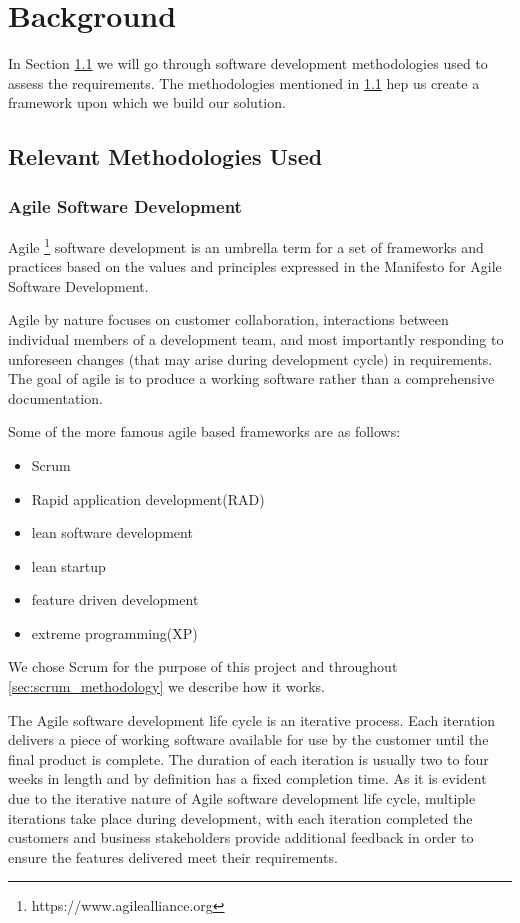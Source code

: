 \chapter{Background}
\label{chapter2}
\thispagestyle{plain}

 In Section \ref{sec:relevant_methodologies_used} we will go through software development methodologies used to assess the requirements. The methodologies mentioned in \ref{sec:relevant_methodologies_used} hep us create a framework upon which we build our solution.

\section{Relevant Methodologies Used}\label{sec:relevant_methodologies_used}


\subsection{Agile Software Development}
Agile \footnote{https://www.agilealliance.org} software development is an umbrella term for a set of frameworks and practices based on the values and principles expressed in the Manifesto for Agile Software Development.

Agile by nature focuses on customer collaboration, interactions between individual members of a development team, and most importantly responding to unforeseen changes (that may arise during development cycle) in requirements. The goal of agile is to produce a working software rather than a comprehensive documentation.

Some of the more famous agile based frameworks are as follows:
\begin{itemize}
  \item Scrum
  \item Rapid application development(RAD)
  \item lean software development
  \item lean startup
  \item feature driven development
  \item extreme programming(XP)
\end{itemize}
We chose Scrum for the purpose of this project and throughout \ref{sec:scrum_methodology} we describe how it works.

The Agile software development life cycle is an iterative process. Each iteration delivers a piece of working software available for use by the customer until the final product is complete. The duration of each iteration is usually two to four weeks in length and by definition has a fixed completion time. 
As it is evident due to the iterative nature of Agile software development life cycle, multiple iterations take place during development, with each iteration completed the customers and business stakeholders provide additional feedback in order to ensure the features delivered meet their requirements.


